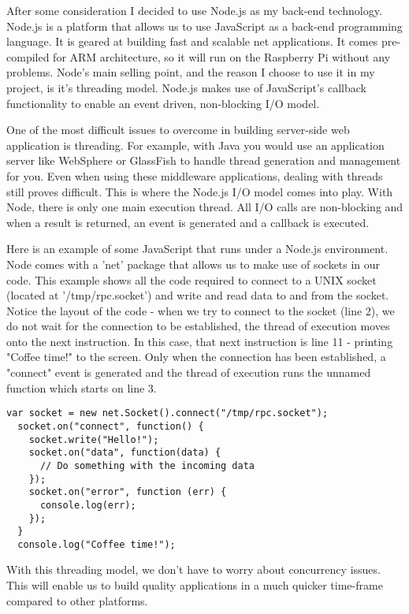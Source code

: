 After some consideration I decided to use Node.js\cite{Node} as my back-end technology. Node.js is a platform that allows us to use JavaScript as a back-end programming language. It is geared at building fast and scalable net applications. It comes pre-compiled for ARM architecture, so it will run on the Raspberry Pi without any problems. Node's main selling point, and the reason I choose to use it in my project, is it's threading model. Node.js makes use of JavaScript's callback functionality to enable an event driven, non-blocking I/O model. 

One of the most difficult issues to overcome in building server-side web application is threading. For example, with Java you would use an application server like WebSphere\cite{WebSphere} or GlassFish\cite{GlassFish} to handle thread generation and management for you. Even when using these middleware applications, dealing with threads still proves difficult. This is where the Node.js I/O model comes into play. With Node, there is only one main execution thread. All I/O calls are non-blocking and when a result is returned, an event is generated and a callback is executed.

Here is an example of some JavaScript that runs under a Node.js environment. Node comes with a 'net' package that allows us to make use of sockets in our code. This example shows all the code required to connect to a UNIX socket (located at '/tmp/rpc.socket') and write and read data to and from the socket. Notice the layout of the code - when we try to connect to the socket (line 2), we do not wait for the connection to be established, the thread of execution moves onto the next instruction. In this case, that next instruction is line 11 - printing "Coffee time!" to the screen. Only when the connection has been established, a "connect" event is generated and the thread of execution runs the unnamed function which starts on line 3. 

\vspace{20px}
\begin{lstlisting}[caption=Node.js and event driven I/O]
  var socket = new net.Socket().connect("/tmp/rpc.socket");
  socket.on("connect", function() {
    socket.write("Hello!");  
    socket.on("data", function(data) {
      // Do something with the incoming data
    });  
    socket.on("error", function (err) {
      console.log(err);
    });
  }
  console.log("Coffee time!");
\end{lstlisting}


With this threading model, we don't have to worry about concurrency issues. This will enable us to build quality applications in a much quicker time-frame compared to other platforms.


